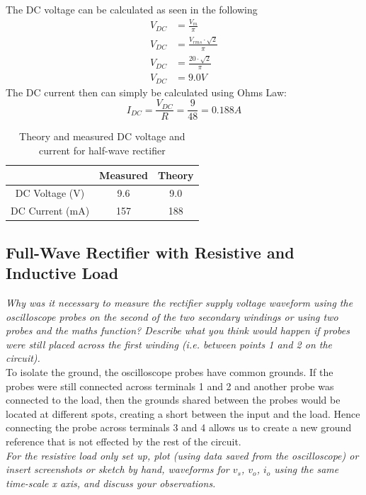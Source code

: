 \documentclass[12pt,a4paper]{article}
\begin{document}
The DC voltage can be calculated as seen in the following
\begin{align*}
V_{DC} &= \frac{V_m}{\pi} \\
V_{DC} &= \frac{V_{rms}\cdot\sqrt{2}}{\pi} \\
V_{DC} &= \frac{20\cdot\sqrt{2}}{\pi} \\
V_{DC} &= 9.0V
\end{align*}
The DC current then can simply be calculated using Ohms Law:
\[I_{DC} = \frac{V_{DC}}{R} = \frac{9}{48} = 0.188A\]

\begin{table}[H]
\caption{Theory and measured DC voltage and current for half-wave rectifier \label{tab:table1}}
\centering
\begin{tabular}{|c|c|c|}
\hline
 & Measured & Theory\\
\hline
DC Voltage (V) & 9.6 & 9.0\\
\hline
DC Current (mA) & 157 & 188\\
\hline
\end{tabular}
\end{table}

\subsection{Full-Wave Rectifier with Resistive and Inductive Load}
\textit{Why was it necessary to measure the rectifier supply voltage waveform using the oscilloscope
probes on the second of the two secondary windings or using two probes and the maths function?
Describe what you think would happen if probes were still placed across the first winding (i.e.
between points 1 and 2 on the circuit).}\\

To isolate the ground, the oscilloscope probes have common grounds. If the probes were still connected across terminals 1 and 2 and another probe was connected to the load, then the grounds shared between the probes would be located at different spots, creating a short between the input and the load. Hence connecting the probe across terminals 3 and 4 allows us to create a new ground reference that is not effected by the rest of the circuit.\\

\textit{For the resistive load only set up, plot (using data saved from the oscilloscope) or insert screenshots
or sketch by hand, waveforms for $v_s$, $v_o$, $i_o$ using the same time-scale x axis, and discuss your
observations.}\\
\end{document}

